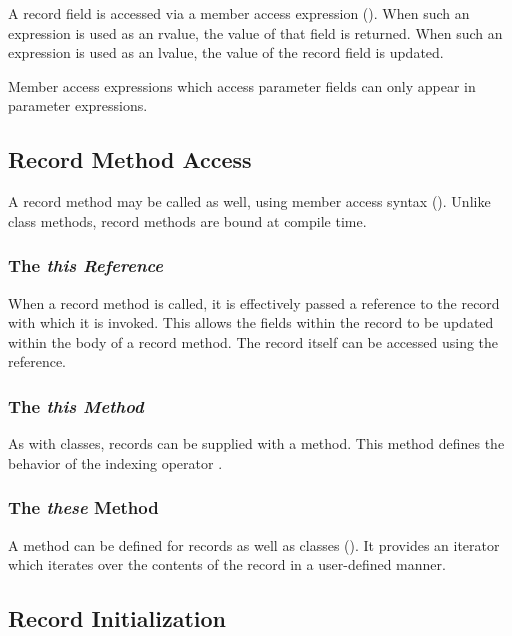 A record field is accessed via a member access expression
().  When such an expression is used as an
rvalue, the value of that field is returned.  When such an expression is used as
an lvalue, the value of the record field is updated.

Member access expressions which access parameter fields can only appear in
parameter expressions.

\subsection{Record Method Access}
\label{Record_Method_Access}

A record method may be called as well, using member access syntax
().  Unlike class methods, record methods are
bound at compile time.  

\subsubsection{The \em{this} Reference}
\label{The_this_Reference}
\index{this@\chpl[this}

When a record method is called, it is effectively passed a reference to the
record with which it is invoked.  This allows the fields within the record to be
updated within the body of a record method.  The record itself can be accessed
using the  reference.

\subsubsection{The \em{this} Method}

As with classes, records can be supplied with a  method.  This method
defines the behavior of the indexing operator \chpl{[]}.

\subsubsection{The {\em these} Method}

A  method can be defined for records as well as classes ().  It
provides an iterator which iterates over the contents of the record in a
user-defined manner.

\subsection{Record Initialization}
\label{Record_Initialization}

